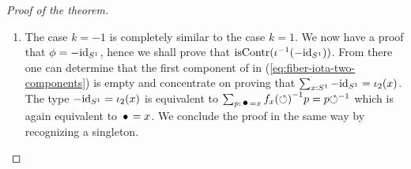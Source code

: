 \documentclass[english,a4]{article}
\begin{document}
\begin{proof}[Proof of the theorem]
\begin{enumerate}
    One can immediately see that the second component of the right
    hand-side in equation~(\ref{eq:fiber-iota-two-components}) is
    empty when instantiated with $\id_\Sc$ for $\phi$: indeed,
    $\false$ being a proposition and $\Sc$ being connected, one only
    need to check that $\id_\Sc = \iota_2(\base)$ is contradictory;
    and because $\iota_2(\base) \jdeq -\id_\Sc$, it follows from
    lemma~\ref{lemma:id-not-equal-oppid}.

    Hence it remains to prove that $\sum_{x:\Sc}\id_\Sc=\iota_1(x)$ is
    contractible. For $x:\Sc$, the type $\id_\Sc = \iota_1(x)$ is
    equivalent (through first function extensionality and then
    $\Sc$-induction) to
    $\sum_{p:\base=\iota_1(x)(\base)}\pathover p T \Sloop p$ where $T$
    is the type family $y\mapsto y=\iota_1(x)(y)$. Now
    $\iota_1(x)(\base)\jdeq x$ and the transport over the loop
    $\Sloop$ in the type family $T$ is given by
    $\iota_1(x)(\Sloop) \blank \inv \Sloop$. In other words,
    \begin{equation}
      \label{eq:10}
      (\id_\Sc = \iota_1(x)) \weq \sum_{p:\base = x}f_x(\Sloop)p = p {\Sloop}
    \end{equation}
    By induction on $p:\base=x$, one can see that the proposition
    $f_x(\Sloop)p=p\Sloop$ is always satisfied. In the end, one has
    \begin{equation}
      \label{eq:11}
      \left(\sum_{x:\Sc}\id_\Sc=\iota_1(x)\right)
      \weq
      \left(\sum_{x:\Sc}\base=x\right)
    \end{equation}
    The type on the right is a singleton, hence contractible. This
    concludes the case $k=1$.
      \item The case $k=-1$ is completely similar to the case $k=1$. We
    now have a proof that $\phi = -\mathord{\mathrm{id}}_{S^1}$, hence we shall prove that
    $\mathrm{isContr}({\iota}^{-1}(-\mathord{\mathrm{id}}_{S^1}))$. From there one can determine that
    the first component of in (\ref{eq:fiber-iota-two-components}) is
    empty and concentrate on proving that
    $\sum_{x:{S^1}}-\mathord{\mathrm{id}}_{S^1} = \iota_2(x)$. The type
    $-\mathord{\mathrm{id}}_{S^1} = \iota_2(x)$ is equivalent to
    $\sum_{p:\base = x}\inv{f_x(\Sloop)}p=p\inv\Sloop$ which is again
    equivalent to $\base=x$. We conclude the proof in the same way by
    recognizing a singleton.
  \end{enumerate}
\end{proof}
\end{document}
